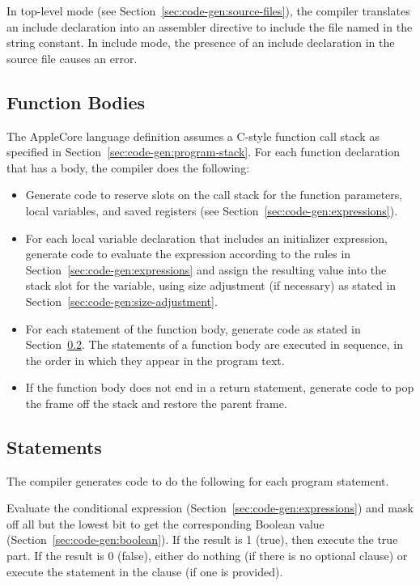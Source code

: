 \documentclass[10pt]{article}
\begin{document}
  In top-level mode (see
Section~\ref{sec:code-gen:source-files}), the compiler translates an
include declaration into an assembler directive to include the file
named in the string constant.  In include mode, the presence of an
include declaration in the source file causes an error.

\subsection{Function Bodies}
\label{sec:code-gen:fn-bodies}

The AppleCore language definition assumes a C-style function call
stack as specified in Section~\ref{sec:code-gen:program-stack}.  For
each function declaration that has a body, the compiler does the
following:
%
\begin{itemize}
%
\item Generate code to reserve slots on the call stack for the
  function parameters, local variables, and saved registers (see
  Section~\ref{sec:code-gen:expressions}).
%
\item For each local variable declaration that includes an initializer
  expression, generate code to evaluate the expression according to
  the rules in Section~\ref{sec:code-gen:expressions} and assign the
  resulting value into the stack slot for the variable, using size
  adjustment (if necessary) as stated in
  Section~\ref{sec:code-gen:size-adjustment}.
%
\item For each statement of the function body, generate code as stated
  in Section~\ref{sec:code-gen:statements}.  The statements of a
  function body are executed in sequence, in the order in which they
  appear in the program text.
%
\item If the function body does not end in a return statement,
  generate code to pop the frame off the stack and restore the parent
  frame.
%
\end{itemize}


\subsection{Statements}
\label{sec:code-gen:statements}

The compiler generates code to do the following for each program
statement.

 Evaluate the conditional expression
(Section~\ref{sec:code-gen:expressions}) and mask off all but the
lowest bit to get the corresponding Boolean value
(Section~\ref{sec:code-gen:boolean}).  If the result is 1 (true), then
execute the true part.  If the result is 0 (false), either do nothing
(if there is no optional  clause) or execute the statement
in the  clause (if one is provided).
\end{document}
